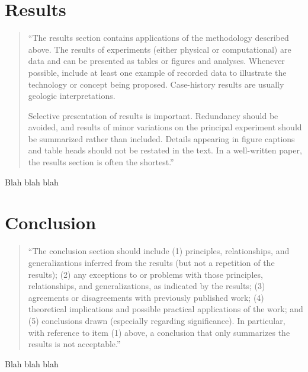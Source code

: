 \documentclass[]{report}   %
\begin{document}
\chapter{Results}           %

\begin{quotation}
	``The results section contains applications of the methodology described above. The results of experiments
	(either physical or computational) are data and can be presented as tables or figures and analyses. Whenever
	possible, include at least one example of recorded data to illustrate the technology or concept being proposed.
	Case-history results are usually geologic interpretations.

	Selective presentation of results is important. Redundancy should be avoided, and results of minor variations on
	the principal experiment should be summarized rather than included. Details appearing in figure captions and
	table heads should not be restated in the text. In a well-written paper, the results section is often the
	shortest.''
\end{quotation}


Blah blah blah





\chapter{Conclusion}		%

\begin{quotation}
	``The conclusion section should include (1) principles, relationships, and generalizations inferred from the
	results (but not a repetition of the results); (2) any exceptions to or problems with those principles,
	relationships, and generalizations, as indicated by the results; (3) agreements or disagreements with previously
	published work; (4) theoretical implications and possible practical applications of the work; and (5) conclusions
	drawn (especially regarding significance). In particular, with reference to item (1) above, a conclusion that
	only summarizes the results is not acceptable.''
\end{quotation}


Blah blah blah






\begin{thebibliography}{9}
\end{thebibliography}
\end{document}
